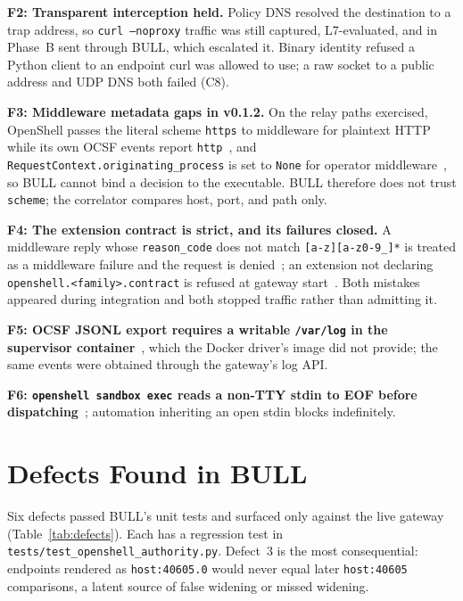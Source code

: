 \documentclass[journal]{IEEEtran}
\newcommand{\bull}{\textsc{BULL}}
\newcommand{\openshell}{OpenShell}
\begin{document}
\textbf{F2: Transparent interception held.} Policy DNS resolved the destination to a trap address, so \texttt{curl --noproxy} traffic was still captured, L7-evaluated, and in Phase~B sent through \bull{}, which escalated it. Binary identity refused a Python client to an endpoint curl was allowed to use; a raw socket to a public address and UDP DNS both failed (C8).

\textbf{F3: Middleware metadata gaps in v0.1.2.} On the relay paths exercised, \openshell{} passes the literal scheme \texttt{https} to middleware for plaintext HTTP while its own OCSF events report \texttt{http}~\cite{OS_Relay}, and \texttt{RequestContext.originating\_process} is set to \texttt{None} for operator middleware~\cite{OS_MiddlewareSrc}, so \bull{} cannot bind a decision to the executable. \bull{} therefore does not trust \texttt{scheme}; the correlator compares host, port, and path only.

\textbf{F4: The extension contract is strict, and its failures closed.} A middleware reply whose \texttt{reason\_code} does not match \texttt{[a-z][a-z0-9\_]*} is treated as a middleware failure and the request is denied~\cite{OS_MiddlewareSrc}; an extension not declaring \texttt{openshell.<family>.contract} is refused at gateway start~\cite{OS_ExtProto}. Both mistakes appeared during integration and both stopped traffic rather than admitting it.

\textbf{F5: OCSF JSONL export requires a writable \texttt{/var/log} in the supervisor container}~\cite{OS_OCSFExport}, which the Docker driver's image did not provide; the same events were obtained through the gateway's log API.

\textbf{F6: \texttt{openshell sandbox exec} reads a non-TTY stdin to EOF before dispatching}~\cite{OS_CLIRun}; automation inheriting an open stdin blocks indefinitely.

\section{Defects Found in \bull{}}
Six defects passed \bull{}'s unit tests and surfaced only against the live gateway (Table~\ref{tab:defects}). Each has a regression test in \texttt{tests/test\_openshell\_authority.py}. Defect~3 is the most consequential: endpoints rendered as \texttt{host:40605.0} would never equal later \texttt{host:40605} comparisons, a latent source of false widening or missed widening.
\end{document}
